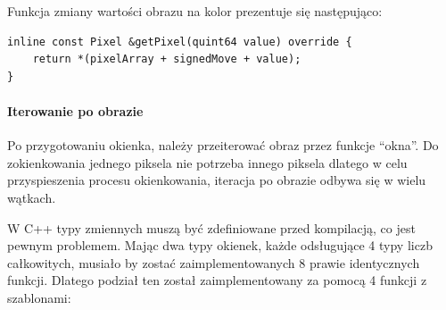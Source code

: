 \par
Funkcja zmiany wartości obrazu na kolor prezentuje się następująco:
\begin{lstlisting}
inline const Pixel &getPixel(quint64 value) override {
    return *(pixelArray + signedMove + value);
}
\end{lstlisting}

\paragraph{Iterowanie po obrazie}
\par
Po przygotowaniu okienka, należy przeiterować obraz przez funkcje \enquote{okna}.
Do zokienkowania jednego piksela nie potrzeba innego piksela dlatego w celu przyspieszenia procesu okienkowania, iteracja po obrazie odbywa się w wielu wątkach.
\par
W C++ typy zmiennych muszą być zdefiniowane przed kompilacją, co jest pewnym problemem.
Mając dwa typy okienek, każde odsługujące 4 typy liczb całkowitych, musiało by zostać zaimplementowanych 8 prawie identycznych funkcji.
Dlatego podział ten został zaimplementowany za pomocą 4 funkcji z szablonami:
